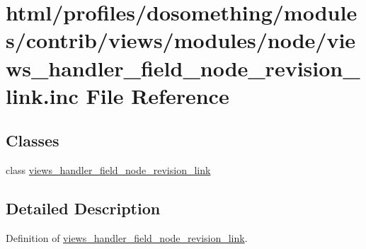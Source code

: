 \hypertarget{views__handler__field__node__revision__link_8inc}{
\section{html/profiles/dosomething/modules/contrib/views/modules/node/views\_\-handler\_\-field\_\-node\_\-revision\_\-link.inc File Reference}
\label{views__handler__field__node__revision__link_8inc}
}
\subsection*{Classes}
\begin{DoxyCompactItemize}
\item 
class \hyperlink{classviews__handler__field__node__revision__link}{views\_\-handler\_\-field\_\-node\_\-revision\_\-link}
\end{DoxyCompactItemize}


\subsection{Detailed Description}
Definition of \hyperlink{classviews__handler__field__node__revision__link}{views\_\-handler\_\-field\_\-node\_\-revision\_\-link}. 